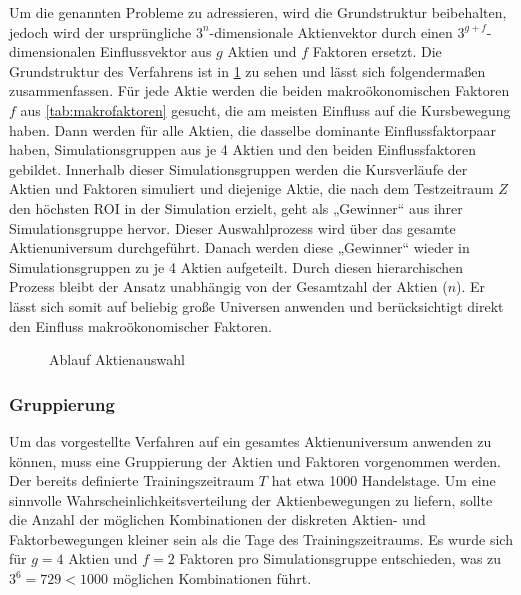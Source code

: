 Um die genannten Probleme zu adressieren, wird die Grundstruktur beibehalten, jedoch wird der ursprüngliche $3^n$-dimensionale Aktienvektor durch einen $3^{g+f}$-dimensionalen Einflussvektor aus $g$ Aktien und $f$ Faktoren ersetzt. Die Grundstruktur des Verfahrens ist in \cref{fig:SDEablauf} zu sehen und lässt sich folgendermaßen zusammenfassen.
Für jede Aktie werden die beiden makroökonomischen Faktoren $f$ aus \cref{tab:makrofaktoren} gesucht, die am meisten Einfluss auf die Kursbewegung haben. Dann werden für alle Aktien, die dasselbe dominante Einflussfaktorpaar haben, Simulationsgruppen aus je 4 Aktien und den beiden Einflussfaktoren gebildet. Innerhalb dieser Simulationsgruppen werden die Kursverläufe der Aktien und Faktoren simuliert und diejenige Aktie, die nach dem Testzeitraum $Z$ den höchsten \ac{ROI} in der Simulation erzielt, geht als „Gewinner“ aus ihrer Simulationsgruppe hervor. Dieser Auswahlprozess wird über das gesamte Aktienuniversum durchgeführt. Danach werden diese „Gewinner“ wieder in Simulationsgruppen zu je 4 Aktien aufgeteilt. Durch diesen hierarchischen Prozess bleibt der Ansatz unabhängig von der Gesamtzahl der Aktien ($n$). Er lässt sich somit auf beliebig große Universen anwenden und berücksichtigt direkt den Einfluss makroökonomischer Faktoren.


\begin{figure}[htbp]
    \centering
    
    \caption{Ablauf Aktienauswahl}\label{fig:SDEablauf}
\end{figure}


\subsubsection{Gruppierung}\label{subsec:gruppierung}

Um das vorgestellte Verfahren auf ein gesamtes Aktienuniversum anwenden zu können, muss eine Gruppierung der Aktien und Faktoren vorgenommen werden. Der bereits definierte Trainingszeitraum $T$ hat etwa 1000 Handelstage. Um eine sinnvolle Wahrscheinlichkeitsverteilung der Aktienbewegungen zu liefern, sollte die Anzahl der möglichen Kombinationen der diskreten Aktien- und Faktorbewegungen kleiner sein als die Tage des Trainingszeitraums. Es wurde sich für $g=4$ Aktien und $f=2$ Faktoren pro Simulationsgruppe entschieden, was zu $3^6 = 729 < 1000$ möglichen Kombinationen führt.



